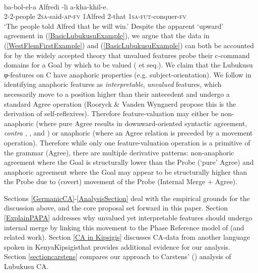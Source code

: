 \documentclass[output=paper
,modfonts
,nonflat
]{langsci/langscibook}
\begin{document}
\ea \label{BasicLubukusuExample}
\\
\gll {}	ba-bol-el-a	Alfredi	-li	a-kha-khil-e.\\
	2-2-people 	2\textsc{sa}-said-\textsc{ap}-\textsc{fv}	1Alfred	2-that	1\textsc{sa}-\textsc{fut}-conquer-\textsc{fv} \\
\glt `The people told Alfred that he will win.'	
\z
\noindent Despite the apparent `upward' agreement in (\ref{BasicLubukusuExample}), we argue that the data in (\ref{WestFlemFirstExample}) and (\ref{BasicLubukusuExample}) can both be accounted for by the widely accepted theory that unvalued features probe their c-command domains for a Goal by which to be valued (\citealt{Chomsky2000} et seq.).  We claim that the Lubukusu φ-features on C have anaphoric properties (e.g. subject-orientation). We follow \citet{Rooryck:2011} in identifying anaphoric features as \textit{interpretable}, \textit{unvalued} features, which necessarily move to a position higher than their antecedent and undergo a standard Agree operation (Rooryck \& Vanden Wyngaerd \citeyear{Rooryck:2011} propose this is the derivation of self-reflexives). Therefore feature-valuation may either be non-anaphoric (where pure Agree results in downward-oriented syntactic agreement, \textit{contra} \citealt{Zeijlstra:2012}, \citealt{Wurmbrand:2011}, and \citealt{Bjorkman:toappearb}) or anaphoric (where an Agree relation 
is preceded by a movement operation). Therefore while only one feature-valuation operation is a primitive of the grammar (Agree), there are multiple derivative patterns: non-anaphoric agreement where the Goal is structurally lower than the Probe (`pure' Agree) and anaphoric agreement where the Goal may appear to be structurally higher than the Probe due to (covert) movement of the Probe (Internal Merge + Agree). 

Sections \ref{GermanicCA}-\ref{AnalysisSection} deal with the empirical grounds for the discussion above, and the core proposal set forward in this paper. Section \ref{ExplainPAPA} addresses why unvalued yet interpretable features should undergo internal merge by linking this movement to the Phase Reference model of \citet{Hinzen:2012} (and related work). Section \ref{CA in Kipsigis} discusses CA-data from another language spoken in Kenya\textemdash Kipsigis\textemdash that provides additional evidence for our analysis. Section \ref{sectioncarstens} compares our approach to Carstens' (\citeyear{Carstens:2016}) analysis of Lubukusu CA.
\end{document}
